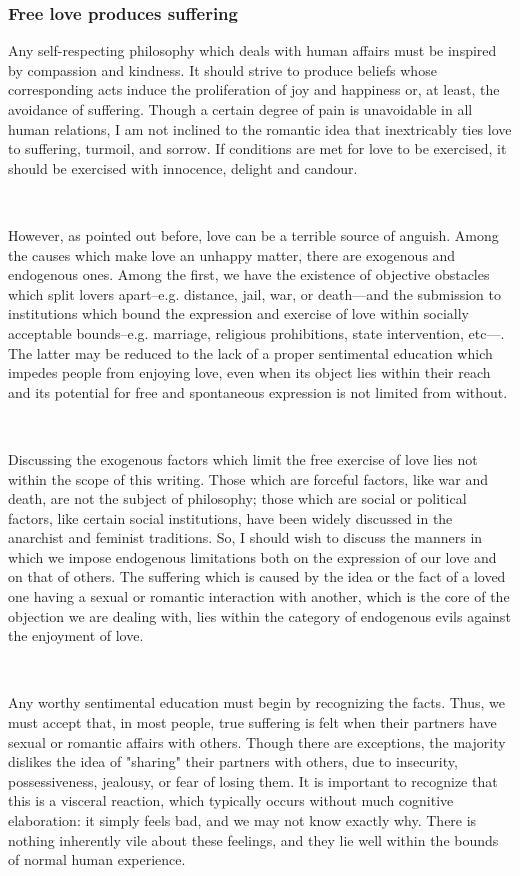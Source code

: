 \documentclass[a4paper, 12pt]{article}
\begin{document}
\subsubsection{Free love produces suffering}

Any self-respecting philosophy which deals with human affairs must be inspired
by compassion and kindness. It should strive to produce beliefs whose
corresponding acts induce the proliferation of joy and happiness or, at least,
the avoidance of suffering. Though a certain degree of pain is unavoidable 
in all human relations, I am not inclined to the romantic idea that inextricably 
ties love to suffering, turmoil, and sorrow. If conditions are met for love to
be exercised, it should be exercised with innocence, delight and candour.

~ 

However, as pointed out before, love can be a terrible source of anguish. Among the
causes which make love an unhappy matter, there are exogenous and
endogenous ones. Among the first, we have the existence of objective
obstacles which split lovers apart--e.g. distance, jail, war, or death---and
the submission to institutions which bound the expression and exercise of love
within socially acceptable bounds--e.g. marriage, religious prohibitions, state
intervention, etc---. The latter may be reduced to the lack of a
proper sentimental education which impedes people from enjoying love, even when its
object lies within their reach and its potential for free and spontaneous
expression is not limited from without. 


~ 

Discussing the exogenous factors which limit the free exercise of love lies not
within the scope of this writing. Those which are forceful factors, like war
and death, are not the subject of philosophy; those which are social or
political factors, like certain social institutions, have been widely discussed
in the anarchist and feminist traditions. So, I should wish to discuss the
manners in which we impose endogenous limitations both on the expression of our
love and on that of others. The suffering which is caused by the idea or the
fact of a loved one having a sexual or romantic interaction with another, which is 
the core of the objection we are dealing with, lies
within the category of endogenous evils against the enjoyment of love.

~

Any worthy sentimental education must begin by recognizing the facts. Thus, we
must accept that, in most people, true suffering is felt when their partners
have sexual or romantic affairs with others. Though there are exceptions, the
majority dislikes the idea of "sharing" their partners with others, due to
insecurity, possessiveness, jealousy, or fear of losing them. It is important
to recognize that this is a visceral reaction, which typically occurs without
much cognitive elaboration: it simply feels bad, and we may not know exactly
why. There is nothing inherently vile about these feelings, and they lie well
within the bounds of normal human experience.
\end{document}
